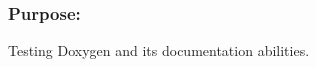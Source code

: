 \subsubsection*{Purpose\+:}


\begin{DoxyItemize}
\item Testing Doxygen and its documentation abilities. 
\end{DoxyItemize}